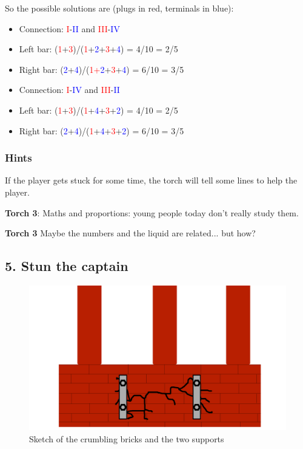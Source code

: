 So the possible solutions are (plugs in red, terminals in blue):
\begin{itemize}
	\item Connection: \textcolor{red}{I}-\textcolor{blue}{II} and \textcolor{red}{III}-\textcolor{blue}{IV}
	\item Left bar: (\textcolor{red}{1}+\textcolor{red}{3})/(\textcolor{red}{1}+\textcolor{blue}{2}+\textcolor{red}{3}+\textcolor{blue}{4}) = 4/10 = 2/5
	\item Right bar: (\textcolor{blue}{2}+\textcolor{blue}{4})/(\textcolor{red}{1+\textcolor{blue}{2}}+\textcolor{red}{3}+\textcolor{blue}{4}) = 6/10 = 3/5
\end{itemize}

\begin{itemize}
	\item Connection: \textcolor{red}{I}-\textcolor{blue}{IV} and \textcolor{red}{III}-\textcolor{blue}{II}
	\item Left bar: (\textcolor{red}{1}+\textcolor{red}{3})/(\textcolor{red}{1}+\textcolor{blue}{4}+\textcolor{red}{3}+\textcolor{blue}{2}) = 4/10 = 2/5
	\item Right bar: (\textcolor{blue}{2}+\textcolor{blue}{4})/(\textcolor{red}{1}+\textcolor{blue}{4}+\textcolor{red}{3}+\textcolor{blue}{2}) = 6/10 = 3/5
\end{itemize}

\subsubsection*{Hints}
If the player gets stuck for some time, the torch will tell some lines to help the player.

\textbf{Torch 3}: Maths and proportions: young people today don't really study them.

\textbf{Torch 3} Maybe the numbers and the liquid are related... but how? 


\subsection{5. Stun the captain}

\begin{figure}[H]
  \centering
  \includegraphics[width=\textwidth]{Images/Puzzles/castleOfDynamia5}
  \caption{Sketch of the crumbling bricks and the two supports}
\end{figure}


